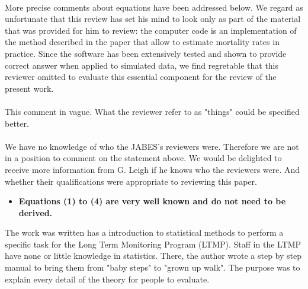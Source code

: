 \documentclass[11pt]{article}
\begin{document}
\begin{spacing}{1.2}
{\\
More precise comments about equations have been addressed below. We regard as unfortunate that this review has set his mind to look only as part of the material that was provided for him to review: the computer code is an implementation of the method described in the paper that allow to estimate mortality rates in practice. Since the software has been extensively tested and shown to provide correct answer when applied to simulated data, we find regretable that this reviewer omitted to evaluate this essential component for the review of the present work. \\

 \\
This comment in vague. What the reviewer refer to as "things" could be specified better.\\

 \\
We have no knowledge of who the JABES's reviewers were. Therefore we are not in a position to comment on the statement above. We would be delighted to receive more information from G. Leigh if he knows who the reviewers were. And whether their qualifications were appropriate to reviewing this paper. \\
 
\begin{itemize}
\item {\bf Equations (1) to (4) are very well known and do not need to be derived.}
\end{itemize}
The work was written has a introduction to statistical methods to perform a specific task for the Long Term Monitoring Program (LTMP). Staff in the LTMP have none or little knowledge in statistics. There, the author wrote a step by step manual to bring them from "baby steps" to "grown up walk". The purpose was to explain every detail of the theory for people to evaluate. \\

}
\end{spacing}
\end{document}
